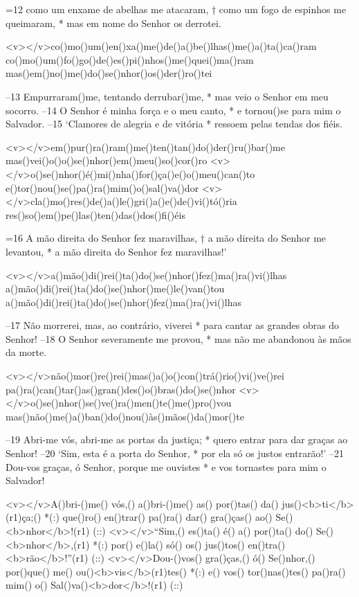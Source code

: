 =12 como um enxame de abelhas me atacaram, †
como um fogo de espinhos me queimaram, *
mas em nome do Senhor os derrotei.

<v></v>co()mo()um()en()xa()me()de()a()be()lhas()me()a()ta()ca()ram
co()mo()um()fo()go()de()es()pi()nhos()me()quei()ma()ram
mas()em()no()me()do()se()nhor()os()der()ro()tei

–13 Empurraram()me, tentando derrubar()me, *
mas veio o Senhor em meu socorro.
–14 O Senhor é minha força e o meu canto, *
e tornou()se para mim o Salvador.
–15 ‘Clamores de alegria e de vitória *
ressoem pelas tendas dos fiéis.

<v></v>em()pur()ra()ram()me()ten()tan()do()der()ru()bar()me
mas()vei()o()o()se()nhor()em()meu()so()cor()ro
<v></v>o()se()nhor()é()mi()nha()for()ça()e()o()meu()can()to
e()tor()nou()se()pa()ra()mim()o()sal()va()dor
<v></v>cla()mo()res()de()a()le()gri()a()e()de()vi()tó()ria
res()so()em()pe()las()ten()das()dos()fi()éis

=16 A mão direita do Senhor fez maravilhas, †
a mão direita do Senhor me levantou, *
a mão direita do Senhor fez maravilhas!’

<v></v>a()mão()di()rei()ta()do()se()nhor()fez()ma()ra()vi()lhas
a()mão()di()rei()ta()do()se()nhor()me()le()van()tou
a()mão()di()rei()ta()do()se()nhor()fez()ma()ra()vi()lhas

–17 Não morrerei, mas, ao contrário, viverei *
para cantar as grandes obras do Senhor!
–18 O Senhor severamente me provou, *
mas não me abandonou às mãos da morte.

<v></v>não()mor()re()rei()mas()a()o()con()trá()rio()vi()ve()rei
pa()ra()can()tar()as()gran()des()o()bras()do()se()nhor
<v></v>o()se()nhor()se()ve()ra()men()te()me()pro()vou
mas()não()me()a()ban()do()nou()às()mãos()da()mor()te

–19 Abri-me vós, abri-me as portas da justiça; *
quero entrar para dar graças ao Senhor!
–20 ‘Sim, esta é a porta do Senhor, *
por ela só os justos entrarão!’
–21 Dou-vos graças, ó Senhor, porque me ouvistes *
e vos tornastes para mim o Salvador!

<v></v>A()bri-()me() vós,() a()bri-()me() as() por()tas() da() jus()<b>ti</b>(r1)ça;() *(:)
que()ro() en()trar() pa()ra() dar() gra()ças() ao() Se()<b>nhor</b>!(r1) (::)
<v></v>``Sim,() es()ta() é() a() por()ta() do() Se()<b>nhor</b>,(r1) *(:)
por() e()la() só() os() jus()tos() en()tra()<b>rão</b>!''(r1) (::)
<v></v>Dou-()vos() gra()ças,() ó() Se()nhor,() por()que() me() ou()<b>vis</b>(r1)tes() *(:)
e() vos() tor()nas()tes() pa()ra() mim() o() Sal()va()<b>dor</b>!(r1) (::)

